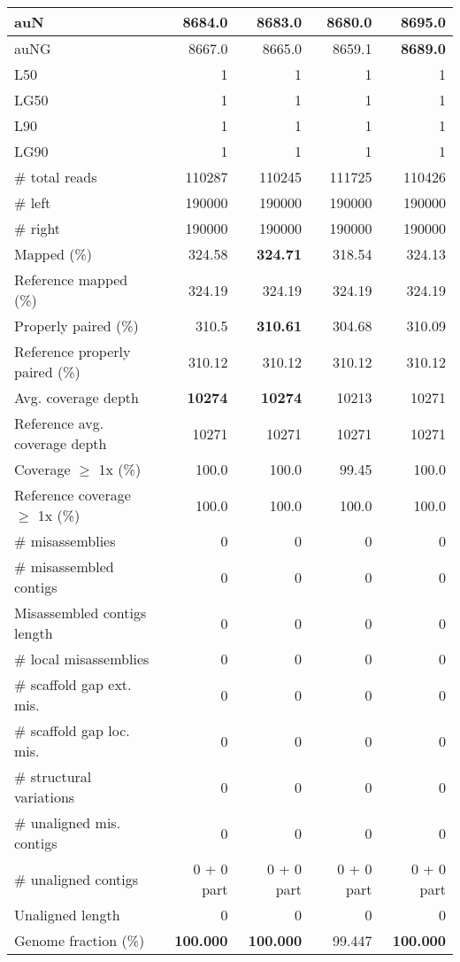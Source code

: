 \documentclass[12pt,a4paper]{article}
\begin{document}
\begin{table}[ht]
\begin{center}
\begin{tabular}{|l*{4}{|r}|}
auN & 8684.0 & 8683.0 & 8680.0 & {\bf 8695.0} \\ \hline
auNG & 8667.0 & 8665.0 & 8659.1 & {\bf 8689.0} \\ \hline
L50 & 1 & 1 & 1 & 1 \\ \hline
LG50 & 1 & 1 & 1 & 1 \\ \hline
L90 & 1 & 1 & 1 & 1 \\ \hline
LG90 & 1 & 1 & 1 & 1 \\ \hline
\# total reads & 110287 & 110245 & 111725 & 110426 \\ \hline
\# left & 190000 & 190000 & 190000 & 190000 \\ \hline
\# right & 190000 & 190000 & 190000 & 190000 \\ \hline
Mapped (\%) & 324.58 & {\bf 324.71} & 318.54 & 324.13 \\ \hline
Reference mapped (\%) & 324.19 & 324.19 & 324.19 & 324.19 \\ \hline
Properly paired (\%) & 310.5 & {\bf 310.61} & 304.68 & 310.09 \\ \hline
Reference properly paired (\%) & 310.12 & 310.12 & 310.12 & 310.12 \\ \hline
Avg. coverage depth & {\bf 10274} & {\bf 10274} & 10213 & 10271 \\ \hline
Reference avg. coverage depth & 10271 & 10271 & 10271 & 10271 \\ \hline
Coverage $\geq$ 1x (\%) & 100.0 & 100.0 & 99.45 & 100.0 \\ \hline
Reference coverage $\geq$ 1x (\%) & 100.0 & 100.0 & 100.0 & 100.0 \\ \hline
\# misassemblies & 0 & 0 & 0 & 0 \\ \hline
\# misassembled contigs & 0 & 0 & 0 & 0 \\ \hline
Misassembled contigs length & 0 & 0 & 0 & 0 \\ \hline
\# local misassemblies & 0 & 0 & 0 & 0 \\ \hline
\# scaffold gap ext. mis. & 0 & 0 & 0 & 0 \\ \hline
\# scaffold gap loc. mis. & 0 & 0 & 0 & 0 \\ \hline
\# structural variations & 0 & 0 & 0 & 0 \\ \hline
\# unaligned mis. contigs & 0 & 0 & 0 & 0 \\ \hline
\# unaligned contigs & 0 + 0 part & 0 + 0 part & 0 + 0 part & 0 + 0 part \\ \hline
Unaligned length & 0 & 0 & 0 & 0 \\ \hline
Genome fraction (\%) & {\bf 100.000} & {\bf 100.000} & 99.447 & {\bf 100.000} \\ \hline

\end{tabular}
\end{center}
\end{table}
\end{document}

